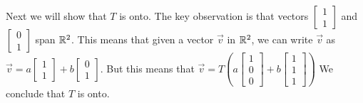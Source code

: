 \documentclass{ximera}
\begin{document}
\begin{example}
\begin{explanation}
Next we will show that $T$ is onto.  
The key observation is that vectors $\begin{bmatrix}1\\1\end{bmatrix}$ and $\begin{bmatrix}0\\1\end{bmatrix}$ span $\mathbb{R}^2$.  %
This means that given a vector $\vec{v}$ in $\mathbb{R}^2$, we can write $\vec{v}$ as $\vec{v}=a\begin{bmatrix}1\\1\end{bmatrix}+b\begin{bmatrix}0\\1\end{bmatrix}$.  But this means that $\vec{v}=T\left(a\begin{bmatrix}1\\0\\0\end{bmatrix}+b\begin{bmatrix}1\\1\\1\end{bmatrix}\right)$  We conclude that $T$ is onto. 
\end{explanation}
\end{example}
\end{document}
